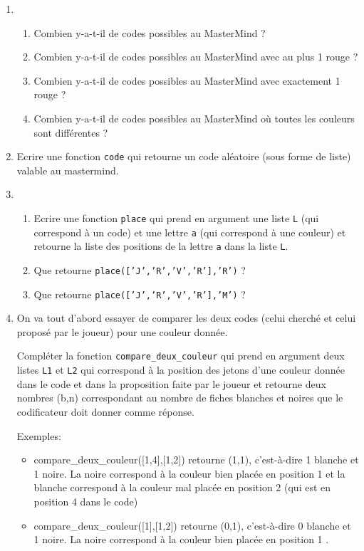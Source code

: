 \documentclass[a4paper, 11pt,reqno]{article}
\begin{document}
\begin{exercice}
\begin{enumerate}

\item 
\begin{enumerate}
\item Combien y-a-t-il de codes possibles au MasterMind ? 
\item Combien y-a-t-il de codes possibles au MasterMind avec au plus 1 rouge ? 
\item Combien y-a-t-il de codes possibles au MasterMind  avec exactement 1 rouge ? 
\item Combien y-a-t-il de codes possibles au MasterMind  où toutes les couleurs sont différentes ?
\end{enumerate}



\item   
Ecrire une fonction  \texttt{code} qui retourne un code aléatoire  (sous forme de liste) valable au mastermind.
\item 
\begin{enumerate}
\item Ecrire une fonction \texttt{place} qui prend en argument une liste \texttt{L} (qui correspond à un code) et une lettre \texttt{a} (qui correspond à une couleur) et retourne la liste des positions de la lettre \texttt{a} dans la liste \texttt{L}. 
\item  Que retourne \texttt{place(['J','R','V','R'],'R')}  ?
\item  Que retourne \texttt{place(['J','R','V','R'],'M')}  ?
\end{enumerate}


\item On va tout d'abord essayer de comparer les deux codes (celui cherché et celui proposé par le joueur) pour une couleur donnée. 

Compléter la fonction \texttt{compare\_deux\_couleur} qui prend en argument deux listes \texttt{L1} et \texttt{L2} qui correspond à la position des jetons d'une couleur donnée dans le code et dans la proposition faite par le joueur et retourne deux nombres (b,n) correspondant au nombre de fiches blanches et noires que le codificateur doit donner comme réponse. 

Exemples:  
\begin{itemize}
\item 


compare\_deux\_couleur([1,4],[1,2]) 
retourne (1,1), c'est-à-dire 1 blanche et 1 noire.  La noire  correspond à la couleur bien placée en position 1  et la blanche correspond à la couleur mal placée en position 2 (qui est en position 4 dans le code) 
\item compare\_deux\_couleur([1],[1,2]) 
retourne (0,1), c'est-à-dire 0 blanche et 1 noire.  La noire  correspond à la couleur bien placée en position 1 .


\end{itemize}
\end{enumerate}
\end{exercice}
\end{document}
